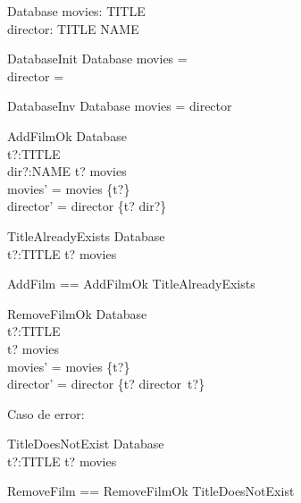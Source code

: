 \begin{zed}
\end{zed}

\begin{schema}{Database}
movies: \power TITLE \\
director: TITLE \pfun NAME
\end{schema}

\begin{schema}{DatabaseInit}
Database
\where
movies = \emptyset \\
director = \emptyset
\end{schema}

\begin{schema}{DatabaseInv}
Database
\where
movies = \dom director
\end{schema}

\begin{schema}{AddFilmOk}
\Delta Database \\
t?:TITLE \\
dir?:NAME
\where
t? \notin movies \\
movies' = movies \cup \{t?\} \\
director' = director \cup \{t? \mapsto dir?\}
\end{schema}


\begin{schema}{TitleAlreadyExists}
\Xi Database \\
t?:TITLE
\where
t? \in movies
\end{schema}

\begin{zed}
AddFilm == AddFilmOk \lor TitleAlreadyExists
\end{zed}


\begin{schema}{RemoveFilmOk}
\Delta Database \\
t?:TITLE \\
\where
t? \in movies \\
movies' = movies \setminus \{t?\} \\
director' = director \setminus \{t? \mapsto director~t?\}
\end{schema}

Caso de error:

\begin{schema}{TitleDoesNotExist}
\Xi Database \\
t?:TITLE
\where
t? \notin movies
\end{schema}

\begin{zed}
RemoveFilm == RemoveFilmOk \lor TitleDoesNotExist
\end{zed}


